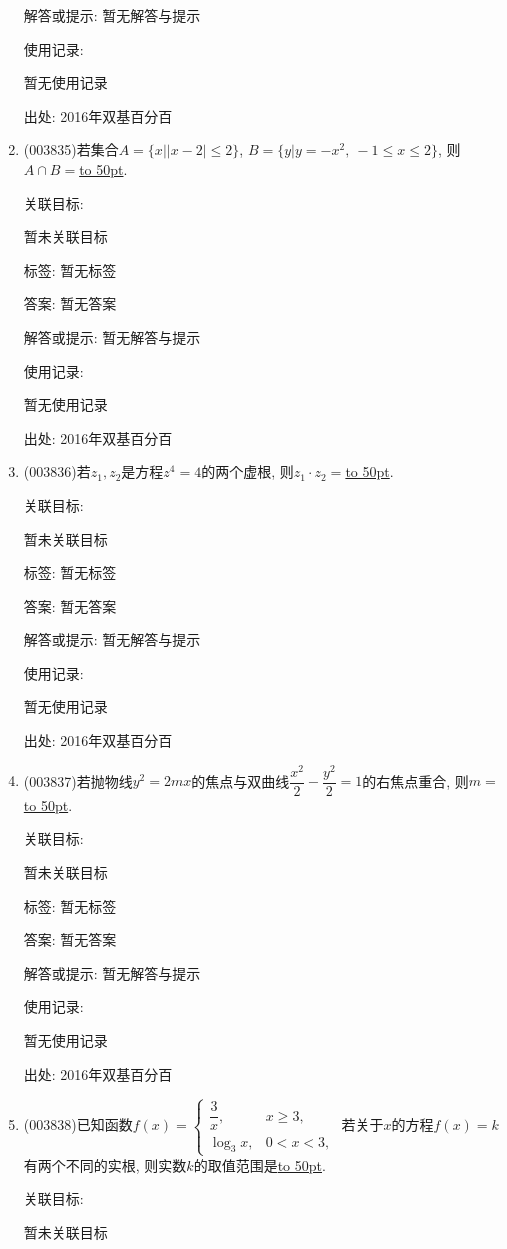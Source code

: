 \documentclass[10pt,a4paper]{article}
\newcommand{\blank}[1]{\underline{\hbox to #1pt{}}}
\begin{document}
\begin{enumerate}[1.]
解答或提示: 暂无解答与提示

使用记录:

暂无使用记录


出处: 2016年双基百分百
\item { (003835)}若集合$A=\{x||x-2|\le 2\}$, $B=\{y|y=-x^2, \ -1\le x\le 2\}$, 则$A\cap B=$\blank{50}.


关联目标:

暂未关联目标



标签: 暂无标签

答案: 暂无答案

解答或提示: 暂无解答与提示

使用记录:

暂无使用记录


出处: 2016年双基百分百
\item { (003836)}若$z_1,z_2$是方程$z^4=4$的两个虚根, 则$z_1\cdot z_2=$\blank{50}.


关联目标:

暂未关联目标



标签: 暂无标签

答案: 暂无答案

解答或提示: 暂无解答与提示

使用记录:

暂无使用记录


出处: 2016年双基百分百
\item { (003837)}若抛物线$y^2=2mx$的焦点与双曲线$\dfrac{x^2}{2}-\dfrac{y^2}{2}=1$的右焦点重合, 则$m=$\blank{50}.


关联目标:

暂未关联目标



标签: 暂无标签

答案: 暂无答案

解答或提示: 暂无解答与提示

使用记录:

暂无使用记录


出处: 2016年双基百分百
\item { (003838)}已知函数$f(x)=\begin{cases}
\dfrac 3x, & x\ge 3,\\ \log_3 x, & 0<x<3,
\end{cases}$ 若关于$x$的方程$f(x)=k$有两个不同的实根, 则实数$k$的取值范围是\blank{50}.


关联目标:

暂未关联目标




\end{enumerate}
\end{document}
